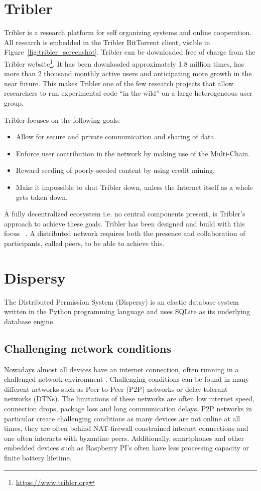 \section{Tribler}

Tribler is a research platform for self organizing systems and online cooperation.
All research is embedded in the Tribler BitTorrent client, visible in Figure~\ref{fig:tribler_screenshot}.
Tribler can be downloaded free of charge from the Tribler website\footnote{\url{https://www.tribler.org}}.
It has been downloaded approximately 1.8 million times, has more than 2 thousand monthly active users and anticipating more growth in the near future.
This makes Tribler one of the few research projects that allow researchers to run experimental code \enquote{in the wild} on a large heterogeneous user group.

Tribler focuses on the following goals:
\begin{itemize}
    \item Allow for secure and private communication and sharing of data.
    \item Enforce user contribution in the network by making use of the Multi-Chain.
    \item Reward seeding of poorly-seeded content by using credit mining.
    \item Make it impossible to shut Tribler down, unless the Internet itself as a whole gets taken down.
\end{itemize}

A fully decentralized ecosystem i.e. no central components present, is Tribler's approach to achieve these goals.
Tribler has been designed and build with this focus~\cite{Pouwelse-tribler,Bakker-tribler} .
A distributed network requires both the presence and collaboration of participants, called peers, to be able to achieve this.

\section{Dispersy}
The Distributed Permission System (Dispersy) is an elastic database system written in the Python programming language and uses SQLite as its underlying database engine.

\subsection{Challenging network conditions}
Nowadays almost all devices have an internet connection, often running in a challenged network environment \cite{dispersy2016dispersy}.
Challenging conditions can be found in many different networks such as Peer-to-Peer (P2P) networks or delay tolerant networks (DTNs).
The limitations of these networks are often low internet speed, connection drops, package loss and long communication delays.
P2P networks in particular create challenging conditions as many devices are not online at all times, they are often behind NAT-firewall constrained internet connections and one often interacts with byzantine peers.
Additionally, smartphones and other embedded devices such as Raspberry PI's often have less processing capacity or finite battery lifetime.


